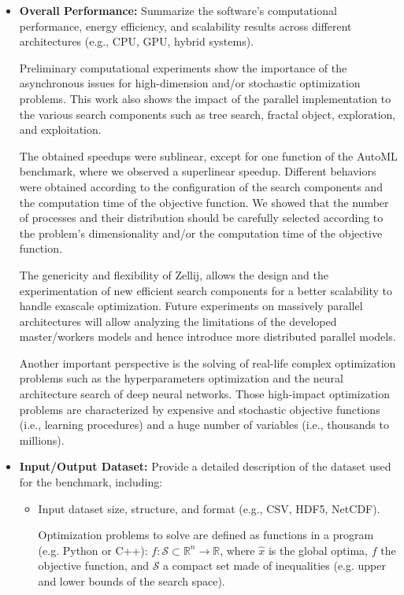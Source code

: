 \begin{itemize}
\item \textbf{Overall Performance:} Summarize the software's computational performance, energy efficiency, and scalability results across different architectures (e.g., CPU, GPU, hybrid systems).

Preliminary computational experiments show the importance of the asynchronous issues for high-dimension and/or stochastic optimization problems. This work also shows the impact of the
parallel implementation to the various search components such
as tree search, fractal object, exploration, and exploitation.

The obtained speedups were sublinear, except for
one function of the AutoML benchmark, where we observed
a superlinear speedup. Different behaviors were obtained according to the configuration of the search components and
the computation time of the objective function. We showed
that the number of processes and their distribution should be carefully selected according to the problem’s dimensionality and/or the computation time of the objective function.

The genericity and flexibility of Zellij, allows the design
and the experimentation of new efficient search components
for a better scalability to handle exascale optimization. Future experiments on massively parallel architectures will allow analyzing the limitations of the developed master/workers models and hence introduce more distributed parallel models.

Another important perspective is the solving of real-life
complex optimization problems such as the hyperparameters
optimization and the neural architecture search of deep neural networks. Those high-impact optimization problems are
characterized by expensive and stochastic objective functions
(i.e., learning procedures) and a huge number of variables (i.e., thousands to millions).


\item \textbf{Input/Output Dataset:} Provide a detailed description of the dataset used for the benchmark, including:
\begin{itemize}
\item Input dataset size, structure, and format (e.g., CSV, HDF5, NetCDF).

Optimization problems to solve are defined as functions in a program (e.g. Python or C++): ${f: \mathcal{S} \subset \mathbb{R}^n \rightarrow \mathbb{R}}$, where $\hat{x}$ is the global optima, $f$ the objective function, and $\mathcal{S}$ a compact set made of inequalities (e.g. upper and lower bounds of the search space). 


\end{itemize}
\end{itemize}
